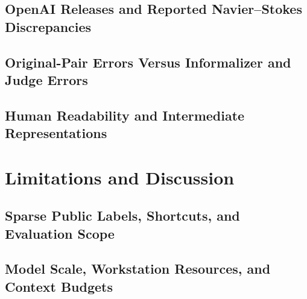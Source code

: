 \documentclass[sigconf,nonacm]{acmart}
\newcommand{\draftspace}{\mbox{}\par\smallskip}
\begin{document}
\subsection{OpenAI Releases and Reported Navier--Stokes Discrepancies}
\draftspace
\subsection{Original-Pair Errors Versus Informalizer and Judge Errors}
\draftspace
\subsection{Human Readability and Intermediate Representations}
\draftspace

\section{Limitations and Discussion}
\subsection{Sparse Public Labels, Shortcuts, and Evaluation Scope}
\draftspace
\subsection{Model Scale, Workstation Resources, and Context Budgets}
\draftspace
\end{document}
